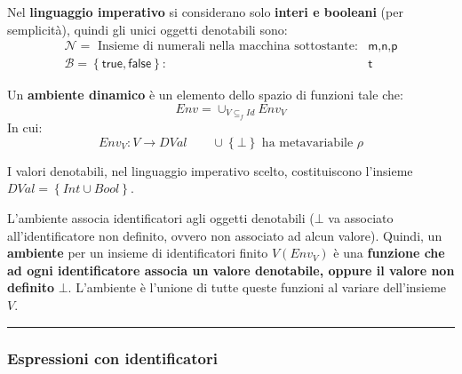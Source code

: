 \documentclass[a4paper]{article}
\newcommand{\longline}{\noindent\rule{\textwidth}{0.4pt}}
\begin{document}
	Nel \textbf{linguaggio imperativo} si considerano solo \textbf{interi e booleani} (per semplicità), quindi gli unici oggetti denotabili sono:
	\begin{equation*}
		\begin{array}{rl}
			\mathcal{N} = \text{ Insieme di numerali nella macchina sottostante:} & \textsf{m,n,p} \\
			\mathcal{B} = \left\{\textsf{true}, \textsf{false}\right\}: & \textsf{t}
		\end{array}
	\end{equation*}
	\begin{boxdef}
		Un \textcolor{Red3}{\textbf{ambiente dinamico}} è un elemento dello spazio di funzioni tale che:
		\begin{equation*}
			Env = \cup_{V \subseteq_{f} Id} Env_{V}
		\end{equation*}
		In cui:
		\begin{equation*}
			Env_{V}: V \rightarrow DVal \hspace{2em} \cup\left\{\bot\right\} \text{ ha metavariabile }\rho
		\end{equation*}
	\end{boxdef}
	
	\noindent
	I valori denotabili, nel linguaggio imperativo scelto, costituiscono l'insieme $DVal = \left\{Int \cup Bool\right\}$.\newline\label{DVal}
	
	\noindent
	L'ambiente associa identificatori agli oggetti denotabili ($\bot$ va associato all'identificatore non definito, ovvero non associato ad alcun valore). Quindi, un \textbf{ambiente} per un insieme di identificatori finito $V\left(Env_{V}\right)$ è una \textbf{funzione che ad ogni identificatore associa un valore denotabile, oppure il valore non definito }$\bot$. L'ambiente è l'unione di tutte queste funzioni al variare dell'insieme $V$.
	
	\longline
	
	\subsubsection{Espressioni con identificatori}
	
\end{document}
